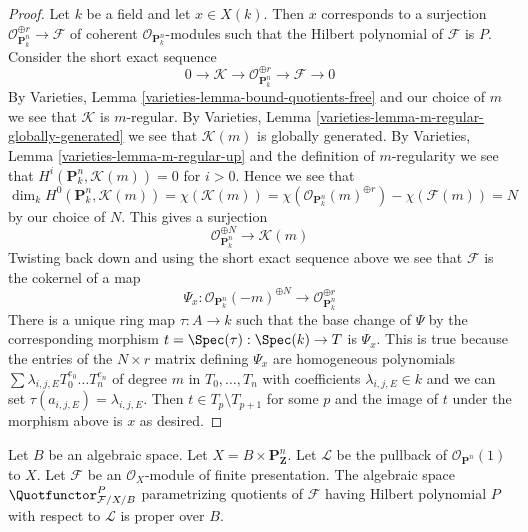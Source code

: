 \begin{proof}
\medskip\noindent
Let $k$ be a field and let $x \in X(k)$. Then $x$ corresponds to
a surjection $\mathcal{O}_{\mathbf{P}^n_k}^{\oplus r} \to \mathcal{F}$
of coherent $\mathcal{O}_{\mathbf{P}^n_k}$-modules
such that the Hilbert polynomial of $\mathcal{F}$ is $P$.
Consider the short exact sequence
$$
0 \to \mathcal{K} \to
\mathcal{O}_{\mathbf{P}^n_k}^{\oplus r} \to
\mathcal{F} \to 0
$$
By Varieties, Lemma \ref{varieties-lemma-bound-quotients-free}
and our choice of $m$ we see that $\mathcal{K}$ is $m$-regular.
By Varieties, Lemma \ref{varieties-lemma-m-regular-globally-generated}
we see that $\mathcal{K}(m)$ is globally generated.
By Varieties, Lemma \ref{varieties-lemma-m-regular-up}
and the definition of $m$-regularity we see that
$H^i(\mathbf{P}^n_k, \mathcal{K}(m)) = 0$ for $i > 0$.
Hence we see that
$$
\dim_k H^0(\mathbf{P}^n_k, \mathcal{K}(m)) =
\chi(\mathcal{K}(m)) =
\chi(\mathcal{O}_{\mathbf{P}^n_k}(m)^{\oplus r}) -
\chi(\mathcal{F}(m)) = N
$$
by our choice of $N$. This gives a surjection
$$
\mathcal{O}_{\mathbf{P}^n_k}^{\oplus N}
\longrightarrow
\mathcal{K}(m)
$$
Twisting back down and using the short exact sequence above
we see that $\mathcal{F}$ is the cokernel of a map
$$
\Psi_x :
\mathcal{O}_{\mathbf{P}^n_k}(-m)^{\oplus N}
\to
\mathcal{O}_{\mathbf{P}^n_k}^{\oplus r}
$$
There is a unique ring map $\tau : A \to k$ such that the base change
of $\Psi$ by the corresponding morphism $t = \Spec(\tau) : \Spec(k) \to T$
is $\Psi_x$. This is true because the entries of the $N \times r$
matrix defining $\Psi_x$ are homogeneous polynomials
$\sum \lambda_{i, j, E} T_0^{e_0} \ldots T_n^{e_n}$
of degree $m$ in $T_0, \ldots, T_n$ with coefficients
$\lambda_{i, j, E} \in k$ and we can set
$\tau(a_{i, j, E}) = \lambda_{i, j, E}$.
Then $t \in T_p \setminus T_{p + 1}$ for some $p$ and
the image of $t$ under the morphism above is $x$ as desired.
\end{proof}

\begin{lemma}
\label{lemma-quot-Pn-over-base}
Let $B$ be an algebraic space. Let $X = B \times \mathbf{P}^n_\mathbf{Z}$.
Let $\mathcal{L}$ be the pullback of $\mathcal{O}_{\mathbf{P}^n}(1)$ to $X$.
Let $\mathcal{F}$ be an $\mathcal{O}_X$-module of finite
presentation. The algebraic space $\Quotfunctor^P_{\mathcal{F}/X/B}$
parametrizing quotients of $\mathcal{F}$
having Hilbert polynomial $P$ with respect to $\mathcal{L}$
is proper over $B$.
\end{lemma}

